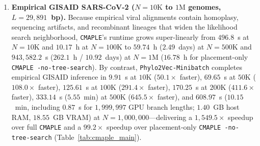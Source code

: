 \documentclass[11pt,a4paper]{article}
\makeatletter
\DeclareRobustCommand{\_}{\ifmmode\nfss@text{\textunderscore}\else\textunderscore\allowbreak\fi}
\theoremstyle{definition}
\makeatother
\begin{document}
\begin{enumerate}
 \item \textbf{Empirical GISAID SARS-CoV-2 ($N=10\text{K}$ to $1\text{M}$ genomes, $L=29{,}891$~bp).} Because empirical viral alignments contain homoplasy, sequencing artifacts, and recombinant lineages that widen the likelihood search neighborhood, \texttt{CMAPLE}'s runtime grows super-linearly from $496.8$~s at $N=10\text{K}$ and $10.17$~h at $N=100\text{K}$ to $59.74$~h ($2.49$~days) at $N=500\text{K}$ and $943{,}582.2$~s ($262.1$~h / $10.92$~days) at $N=1\text{M}$ ($16.78$~h for placement-only \texttt{CMAPLE -no-tree-search}). By contrast, \texttt{Phylo2Vec-Minibatch} completes empirical GISAID inference in $9.91$~s at $10\text{K}$ ($50.1\times$ faster), $69.65$~s at $50\text{K}$ ($108.0\times$ faster), $125.61$~s at $100\text{K}$ ($291.4\times$ faster), $170.25$~s at $200\text{K}$ ($411.6\times$ faster), $333.14$~s ($5.55$~min) at $500\text{K}$ ($645.5\times$ faster), and $608.97$~s ($10.15$~min, including $0.87$~s for $1{,}999{,}997$ GPU branch lengths; $1.40$~GB host RAM, $18.55$~GB VRAM) at $N=1{,}000{,}000$---delivering a $1{,}549.5\times$ speedup over full \texttt{CMAPLE} and a $99.2\times$ speedup over placement-only \texttt{CMAPLE -no-tree-search} (Table~\ref{tab:cmaple_main}).
\end{enumerate}
\end{document}
